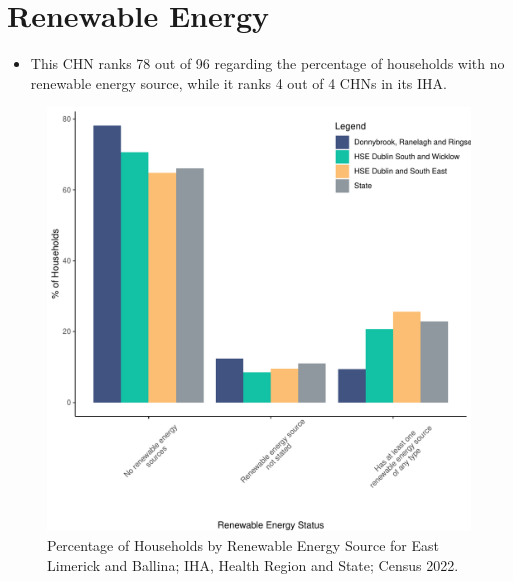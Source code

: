 \documentclass{article}
\begin{document}
\section{Renewable Energy}\label{sect:RE}
\begin{itemize}
\item This CHN ranks  78 out of 96 regarding the percentage of households with no renewable energy source, while it ranks   4 out of 4 CHNs in its IHA.
\end{itemize}
\begin{figure}[H]
	\centering
	\includegraphics[width = 140mm]{../figures/RenewableEnergyED.pdf}
	\caption{Percentage of Households by Renewable Energy Source for East Limerick and Ballina; IHA, Health Region and State; Census 2022.}
	\label{fig:vbnv}
	\end{figure}
\end{document}

